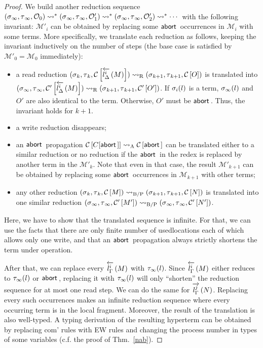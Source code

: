 \begin{proof}
We build another reduction sequence
$
\conf{_\infty}{_\infty}{\hypert_0}
\reduce^\ast
\conf{_\infty}{_\infty}{\hypert'_1}
\reduce^\ast
\conf{_\infty}{_\infty}{\hypert'_2}
\reduce^\ast\cdots
$
with the following invariant:
$\mathcal M'_i$ can be obtained by replacing some $\abort$ occurrences
in $\mathcal M_i$ with some terms.
More specifically, we translate each reduction as follows, keeping the
invariant inductively on the number of steps
(the base case is satisfied by $\mathcal M'_0 = \mathcal M_0$ immediately):
\begin{itemize}
 \item a read reduction $\conf{_k}{_k}{\hypc{}{\rtol i l\Delta M}}
       \rreduce
       \conf{_{k+1}}{_{k+1}}{\hypc{}{O}}$ is translated into
       $\conf{_\infty}{_\infty}{\hypc'{\rtol i l\Delta M}} \rreduce
       \conf{_{k+1}}{_{k+1}}{\hypc'{O'}}$.
       If $\lstore_i(l)$ is a term,
       $\lstore_\infty(l)$ and $O'$ are also identical to the term.
       Otherwise, $O'$ must be $\abort$.
       Thus, the invariant
       holds for $k+1$.
 \item a write reduction disappears;
 \item an $\abort$ propagation
       $\hypc{}{C[\abort]} \areduce \hypc{}{\abort}$ can be translated
       either to a similar reduction or no reduction if the $\abort$ in
       the redex is replaced by another term in the $\mathcal{M'}_k$.
       Note that even in that case, the result $\mathcal{M'}_{k+1}$ can
       be obtained by replacing some $\abort$ occurrences in
       $\mathcal{M}_{k+1}$ with other terms;
 \item any other reduction $\conf{_k}{_k}{\hypc{}{M}} \bpreduce
       \conf{_{k+1}}{_{k+1}}{\hypc{}{N}}$
       is translated into one similar reduction
       $\conf{_\infty}{_\infty}{\hypc{'}{M'}}\bpreduce
        \conf{_\infty}{_\infty}{\hypc{'}{N'}}$.
\end{itemize}
Here, we have to show that the translated sequence is infinite.
For that, we can use the facts that
 there are only finite
number of usedlocations each of which allows only one write, and that
an $\abort$ propagation always
strictly shortens the term under operation. 
 
 After that, we can replace
 every ${\rtol i l\Gamma M}$ with
 $\rstore_\infty(l)$.
 Since $\rtol i l\Gamma M$ either reduces to $\rstore_\infty(l)$ or $\abort$,
 replacing it with $\rstore_\infty(l)$ will only ``shorten'' the reduction
 sequence for at most one read step.
 We can do the same for $\ltor j l \Gamma N$.
 Replacing every such occurrences
 makes an infinite reduction sequence where every occurring term is
 in the local fragment.
 Moreover, 
 the result of the translation is also well-typed.
 A typing derivation of the resulting hyperterm can be obtained by
 replacing com' rules with EW rules and changing the process number in
 types of some variables (c.f. the proof of Thm.~\ref{nab}).


\end{proof}
